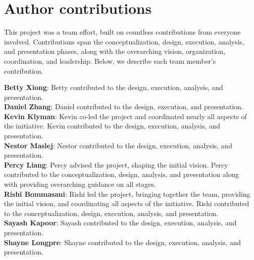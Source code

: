 \hypertarget{author-contributions}{\section{Author contributions}}
\label{app:author-contributions}
This project was a team effort, built on countless contributions from everyone involved. 
Contributions span the conceptualization, design, execution, analysis, and presentation phases, along with the overarching vision, organization, coordination, and leadership.
Below, we describe each team member's contribution.


\noindent 
\textbf{Betty Xiong}: Betty contributed to the design, execution, analysis, and presentation.
\\
\textbf{Daniel Zhang}: Daniel contributed to the design, execution, and presentation.
\\
\textbf{Kevin Klyman}: Kevin co-led the project and coordinated nearly all aspects of the initiative. Kevin contributed to the design, execution, analysis, and presentation. 
\\
\textbf{Nestor Maslej}: Nestor contributed to the design, execution, analysis, and presentation.
\\
\textbf{Percy Liang}: Percy advised the project, shaping the initial vision. Percy contributed to the conceptualization, design, analysis, and presentation along with providing overarching guidance on all stages. 
\\
\textbf{Rishi Bommasani}: Rishi led the project, bringing together the team, providing the initial vision, and coordinating all aspects of the initiative. Rishi contributed to the conceptualization, design, execution, analysis, and presentation. 
\\
\textbf{Sayash Kapoor}: Sayash contributed to the design, execution, analysis, and presentation.
\\
\textbf{Shayne Longpre}: Shayne contributed to the design, execution, analysis, and presentation.
\\